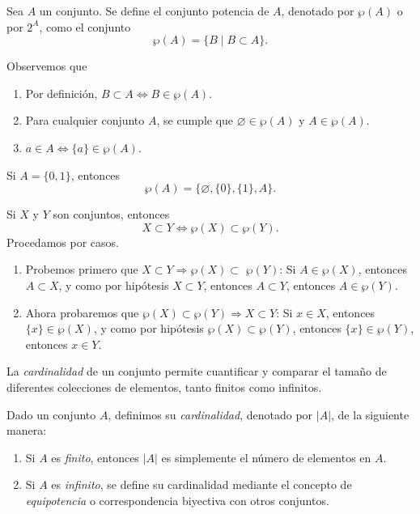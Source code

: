 \begin{definicion}{}{}
    Sea $A$ un conjunto. Se define el conjunto potencia de $A$, denotado por $\wp(A)$ o por $2^A$, como el conjunto
    $$\wp(A) = \{B \mid B \subset A\}.$$
\end{definicion}

Observemos que
\begin{enumerate}
    \item Por definición, $B \subset A \Longleftrightarrow B \in \wp(A)$.
    \item Para cualquier conjunto $A$, se cumple que $\varnothing \in \wp(A)$ y $A \in \wp(A)$.
    \item $a \in A \Longleftrightarrow \{a\} \in \wp(A)$.
\end{enumerate}

\begin{examplebox}{}{}
    Si $A = \{0, 1\}$, entonces
    $$\wp(A) = \big\{\varnothing, \{0\}, \{1\}, A \big\}.$$
\end{examplebox}

\begin{theorem}{}{}
    Si $X$ y $Y$ son conjuntos, entonces
    $$X \subset Y \Longleftrightarrow \wp(X) \subset \wp(Y).$$
    \tcblower
    \demostracion Procedamos por casos.
    \begin{enumerate}[label=\roman*., topsep=6pt, itemsep=0pt]
        \item Probemos primero que $X \subset Y \Longrightarrow \wp(X) \subset$ $\wp(Y)$: Si $A \in \wp(X)$, entonces $A \subset X$, y como por hipótesis $X \subset Y$, entonces $A \subset Y$, entonces $A \in \wp(Y)$.
        \item Ahora probaremos que $\wp(X) \subset \wp(Y) \Longrightarrow X \subset Y$: Si $x \in X$, entonces $\{x\} \in \wp(X)$, y como por hipótesis $\wp(X) \subset \wp(Y)$, entonces $\{x\} \in \wp(Y)$, entonces $x \in Y$.
    \end{enumerate}
\end{theorem}

La \emph{cardinalidad} de un conjunto permite cuantificar y comparar el tamaño de diferentes colecciones de elementos, tanto finitos como infinitos.

\begin{definicion}{}{}
    Dado un conjunto $A$, definimos su \emph{cardinalidad}, denotado por $|A|$, de la siguiente manera:
    \begin{enumerate}[label=\roman*., topsep=6pt, itemsep=0pt]
        \item Si $A$ es \emph{finito}, entonces $|A|$ es simplemente el número de elementos en $A$.
        \item Si $A$ es \emph{infinito}, se define su cardinalidad mediante el concepto de \emph{equipotencia} o correspondencia biyectiva con otros conjuntos.
    \end{enumerate}
\end{definicion}

